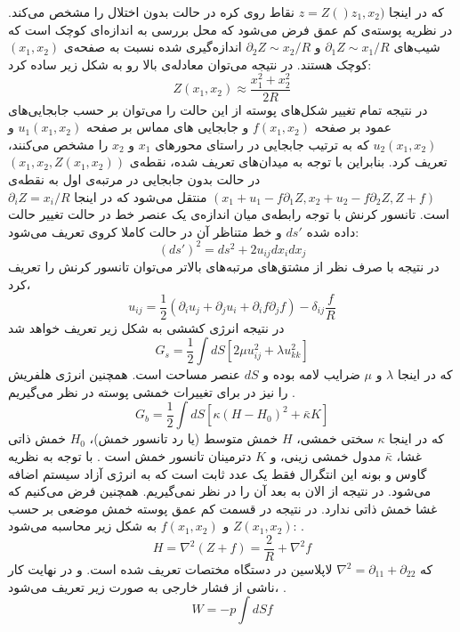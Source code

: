 که در اینجا 
$z=Z()z_1,x_2)$
نقاط روی کره در حالت بدون اختلال را مشخص می‌کند. در نظریه پوسته‌ی کم عمق
\cite{nelsonJPhysFrance1987}
 فرض می‌شود که محل بررسی به اندازه‌ای کوچک است که شیب‌های 
$\partial_1Z\sim x_1/R$
و 
$\partial_2Z\sim x_2/R$
اندازه‌گیری شده نسبت به صفحه‌ی 
$(x_1,x_2)$
کوچک هستند. در نتیجه می‌توان معادله‌ی بالا رو به شکل زیر ساده کرد:
\begin{equation}
Z(x_1,x_2) \approx \frac{x_1^2+x_2^2}{2R}
\label{eq:nelsonS2}
\end{equation}
در نتیجه تمام تغییر شکل‌های پوسته از این حالت را می‌توان بر حسب جابجایی‌های عمود بر صفحه‌
 $f(x_1,x_2)$
و جابجایی های مماس بر صفحه 
$u_1(x_1,x_2)$
و
$u_2(x_1,x_2)$
که به ترتیب جابجایی در راستای محورهای 
$x_1$
و
$x_2$
را مشخص می‌کنند، تعریف کرد. بنابراین با توجه به میدان‌های تعریف شده، نقطه‌ی 
$(x_1,x_2,Z(x_1,x_2))$
در حالت بدون جابجایی در مرتبه‌ی اول به نقطه‌ی 
$(x_1+u_1-f\partial_1Z,x_2+u_2-f\partial_2Z,Z+f)$
منتقل می‌شود که در اینجا 
$\partial_iZ=x_i/R$
است. تانسور کرنش با توجه رابطه‌ی میان اندازه‌ی یک عنصر خط در حالت تغییر حالت داده شده
$ds'$
و خط متناظر آن در حالت کاملا کروی تعریف می‌شود:
\begin{equation}
(ds')^2=ds^2+2u_{ij}dx_idx_j
\label{eq:nelsonS3}
\end{equation}
در نتیجه با صرف نظر از مشتق‌های مرتبه‌های بالاتر می‌توان تانسور کرنش را تعریف کرد،
\begin{equation}
u_{ij}=\frac{1}{2}(\partial_iu_j+\partial_ju_i+\partial_if\partial_jf)-\delta_{ij}\frac{f}{R}
\label{eq:nelsonS4}
\end{equation}
در نتیجه انرژی کششی به شکل زیر تعریف خواهد شد
\begin{equation}
G_s=\frac{1}{2}\int dS\left[2\mu u_{ij}^2+\lambda u_{kk}^2\right]
\label{eq:nelsonS5}
\end{equation}
  که در اینجا 
$\lambda$
و
$\mu$
ضرایب لامه
بوده و 
$dS$
عنصر مساحت است. همچنین انرژی هلفریش
را نیز در برای تغییرات خمشی پوسته در نظر می‌گیریم
\cite{Helfrich1973}.
\begin{equation}
G_b=\frac{1}{2}\int dS\left[\kappa(H-H_0)^2+\bar\kappa K\right]
\label{eq:nelsonS6}
\end{equation}
  که در اینجا 
$\kappa$
سختی خمشی، 
$H$
خمش متوسط (یا رد
تانسور خمش)،
$H_0$
خمش ذاتی غشا،
$\bar\kappa$
مدول خمشی زینی،
و
$K$
دترمینان تانسور خمش است . با توجه به نظریه گاوس و بونه
این انتگرال فقط یک عدد ثابت است که به انرژی آزاد سیستم اضافه می‌شود. در نتیجه از الان به بعد آن را در نظر نمی‌گیریم. همچنین فرض می‌کنیم که غشا خمش ذاتی ندارد. در نتیجه در قسمت کم عمق پوسته خمش موضعی بر حسب 
$Z(x_1,x_2)$
و 
$f(x_1,x_2)$
به شکل زیر محاسبه می‌شود:
\cite{Helfrich1973}.
\begin{equation}
H =\nabla^2(Z+f)=\frac{2}{R}+\nabla^2f
\label{eq:nelsonS7}
\end{equation}
که 
$\nabla^2=\partial_{11}+\partial_{22}$
لاپلاسین در دستگاه مختصات تعریف شده است. و در نهایت کار ناشی از فشار خارجی به صورت زیر تعریف می‌شود،
\cite{Helfrich1973}.
\begin{equation}
W=-p\int dSf
\label{eq:nelsonS8}
\end{equation}

